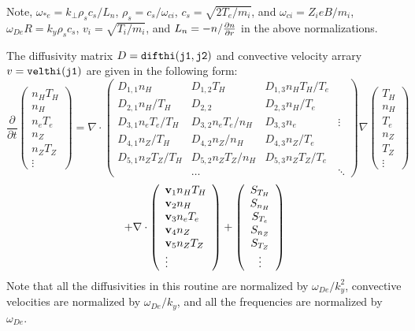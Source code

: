 Note, $ \omega_{*e} = k_\perp \rho_s c_s / L_n $,
$ \rho_s = c_s / \omega_{ci} $, $ c_s = \sqrt{ 2 T_e / m_i} $,
and $ \omega_{ci} = Z_i e B / m_i $, 
$ \omega_{De} R = k_y \rho_s c_s $,
$v_i = \sqrt{T_i / m_i}$, and $ L_n = - n / \frac{\partial n}{\partial r} $
in the above normalizations.

The diffusivity matrix $ D = {\tt difthi(j1,j2)}$
and convective velocity arrary $ v = {\tt velthi(j1)} $
are given in the following form:
$$ \frac{\partial}{\partial t}
 \left( \begin{array}{c} n_H T_H  \\ n_H \\ n_e T_e \\ 
    n_Z \\ n_Z T_Z \\ \vdots
    \end{array} \right)
 = \nabla \cdot
\left( \begin{array}{llll} 
D_{1,1} n_H & D_{1,2} T_H & D_{1,3} n_H T_H / T_e \\
D_{2,1} n_H / T_H & D_{2,2} & D_{2,3} n_H / T_e \\
D_{3,1} n_e T_e / T_H & D_{3,2} n_e T_e / n_H & D_{3,3} n_e & \vdots \\
D_{4,1} n_Z / T_H & D_{4,2} n_Z / n_H & D_{4,3} n_Z / T_e \\
D_{5,1} n_Z T_Z / T_H & D_{5,2} n_Z T_Z / n_H & 
        D_{5,3} n_Z T_Z / T_e \\
 & \ldots & & \ddots
\end{array} \right)
 \nabla
 \left( \begin{array}{c}  T_H \\ n_H \\  T_e \\ 
   n_Z \\  T_Z \\ \vdots
    \end{array} \right)
$$
$$
 + \nabla \cdot
\left( \begin{array}{l} {\bf v}_1 n_H T_H \\ {\bf v}_2 n_H \\
   {\bf v}_3 n_e T_e \\
   {\bf v}_4 n_Z \\ {\bf v}_5 n_Z T_Z \\ \vdots \end{array} \right) +
 \left( \begin{array}{c} S_{T_H} \\ S_{n_H} \\ S_{T_e} \\
    S_{n_Z} \\ S_{T_Z} \\ \vdots
    \end{array} \right) $$
Note that all the diffusivities in this routine are normalized by
$ \omega_{De} / k_y^2 $, 
convective velocities are normalized by $ \omega_{De} / k_y $, 
and all the frequencies are normalized by $ \omega_{De} $.


